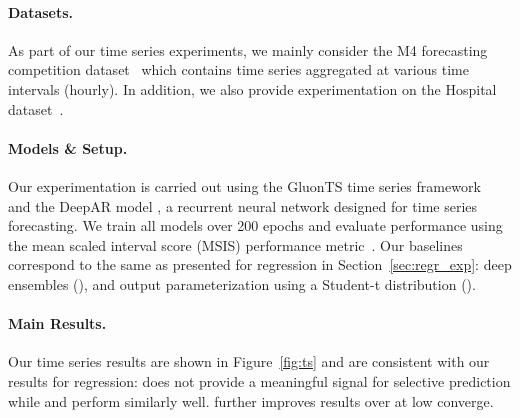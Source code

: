 \paragraph{Datasets.} As part of our time series experiments, we mainly consider the M4 forecasting competition dataset~\citep{makridakis2020m4} which contains time series aggregated at various time intervals (\eg hourly). In addition, we also provide experimentation on the Hospital dataset~\citep{hyndman2015expsmooth}. %

\paragraph{Models \& Setup.} Our experimentation is carried out using the GluonTS time series framework~\citep{alexandrov2019gluonts} and the DeepAR model \citep{salinas2020deepar}, a recurrent neural network designed for time series forecasting. We train all models over 200 epochs and evaluate performance using the mean scaled interval score (MSIS) performance metric~\citep{makridakis2020m4}. Our baselines correspond to the same as presented for regression in Section~\ref{sec:regr_exp}: deep ensembles (\de), and output parameterization using a Student-t distribution (\odist).

\paragraph{Main Results.} Our time series results are shown in Figure~\ref{fig:ts} and are consistent with our results for regression: \odist does not provide a meaningful signal for selective prediction while \sptd and \de perform similarly well. \sptd further improves results over \de at low converge.



